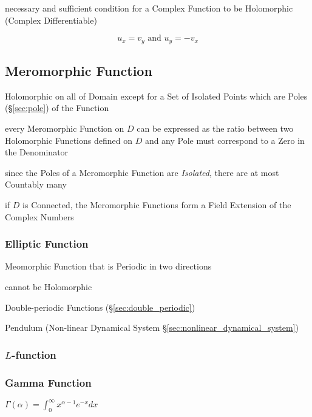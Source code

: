 necessary and sufficient condition for a Complex Function to be Holomorphic
(Complex Differentiable)

\[
  u_x = v_y \text{ and } u_y = - v_x
\]



\subsection{Meromorphic Function}\label{sec:meromorphic_function}

Holomorphic on all of Domain except for a Set of Isolated Points which are
Poles (\S\ref{sec:pole}) of the Function

every Meromorphic Function on $D$ can be expressed as the ratio between two
Holomorphic Functions defined on $D$ and any Pole must correspond to a Zero in
the Denominator

since the Poles of a Meromorphic Function are \emph{Isolated}, there are at
most Countably many

if $D$ is Connected, the Meromorphic Functions form a Field Extension of the
Complex Numbers



\subsubsection{Elliptic Function}\label{sec:elliptic_function}

Meomorphic Function that is Periodic in two directions

cannot be Holomorphic

Double-periodic Functions (\S\ref{sec:double_periodic})

Pendulum (Non-linear Dynamical System \S\ref{sec:nonlinear_dynamical_system})



\subsubsection{$L$-function}\label{sec:l_function}

\subsubsection{Gamma Function}\label{sec:gamma_function}

$\Gamma(\alpha) = \int_0^{\infty} x^{\alpha -1} e^{-x} dx$

